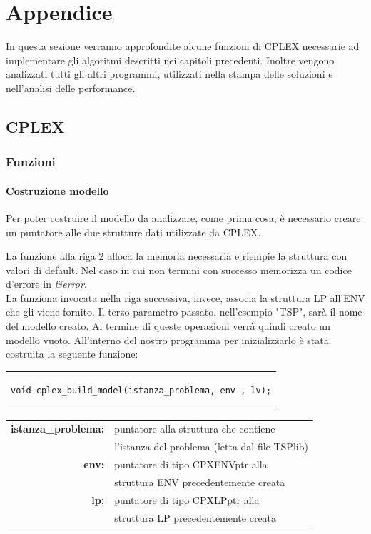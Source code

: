 \chapter{Appendice}
In questa sezione verranno approfondite alcune funzioni di CPLEX necessarie ad implementare gli algoritmi descritti nei capitoli precedenti. Inoltre vengono analizzati tutti gli altri programmi, utilizzati nella stampa delle soluzioni e nell'analisi delle performance.

\section{CPLEX}
\subsection{Funzioni}
\subsubsection{Costruzione modello}
Per poter costruire il modello da analizzare, come prima cosa, è necessario creare un puntatore alle due strutture dati utilizzate da CPLEX.

La funzione alla riga 2 alloca la memoria necessaria e riempie la struttura con valori di default. Nel caso in cui non termini con successo memorizza un codice d'errore in \textit{\&error}.\\
La funziona invocata nella riga successiva, invece, associa la struttura LP all'ENV che gli viene fornito. Il terzo parametro passato, nell'esempio "TSP", sarà il nome del modello creato.
Al termine di queste operazioni verrà quindi creato un modello vuoto. All'interno del nostro programma per inizializzarlo è stata costruita la seguente funzione:
\begin{center}
\begin{tabular}{c}
\begin{lstlisting}[linewidth=320pt, basicstyle=\footnotesize\sffamily,] 
void cplex_build_model(istanza_problema, env , lv);
\end{lstlisting}
\end{tabular}
\end{center}
\begin{table}[h]
\centering
\begin{tabular}{rl}
\textbf{istanza\_problema: } & {puntatore alla struttura che contiene} \\
&  {l'istanza del problema (letta dal file TSPlib)} \\
\textbf{env: } & {puntatore di tipo CPXENVptr alla}\\
& {struttura ENV precedentemente creata}\\
\textbf{lp: } & {puntatore di tipo CPXLPptr alla}\\
& {struttura LP  precedentemente creata}\\
\end{tabular}
\end{table}
